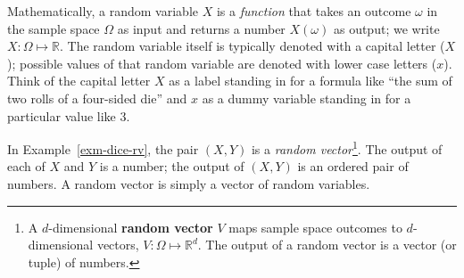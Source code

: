 \documentclass[
  letterpaper,
  DIV=11,
  numbers=noendperiod]{scrreprt}
\theoremstyle{plain}
\theoremstyle{definition}
\theoremstyle{definition}
\theoremstyle{definition}
\theoremstyle{remark}
\begin{document}
\begin{table}

\caption{\label{tbl-dice-rv-sol-table}Table representing the sum (\(X\))
and larger (\(Y\)) of two rolls of a four-sided die}


\end{table}%

Mathematically, a random variable \(X\) is a \emph{function} that takes
an outcome \(\omega\) in the sample space \(\Omega\) as input and
returns a number \(X(\omega)\) as output; we write
\(X:\Omega\mapsto \mathbb{R}\). The random variable itself is typically
denoted with a capital letter (\(X\)); possible values of that random
variable are denoted with lower case letters (\(x\)). Think of the
capital letter \(X\) as a label standing in for a formula like ``the sum
of two rolls of a four-sided die'' and \(x\) as a dummy variable
standing in for a particular value like 3.

In Example~\ref{exm-dice-rv}, the pair \((X, Y)\) is a \emph{random
vector}\footnote{A \(d\)-dimensional \textbf{random vector} \(V\) maps
  sample space outcomes to \(d\)-dimensional vectors,
  \(V:\Omega \mapsto \mathbb{R}^d\). The output of a random vector is a
  vector (or tuple) of numbers.}. The output of each of \(X\) and \(Y\)
is a number; the output of \((X, Y)\) is an ordered pair of numbers. A
random vector is simply a vector of random variables.
\end{document}
